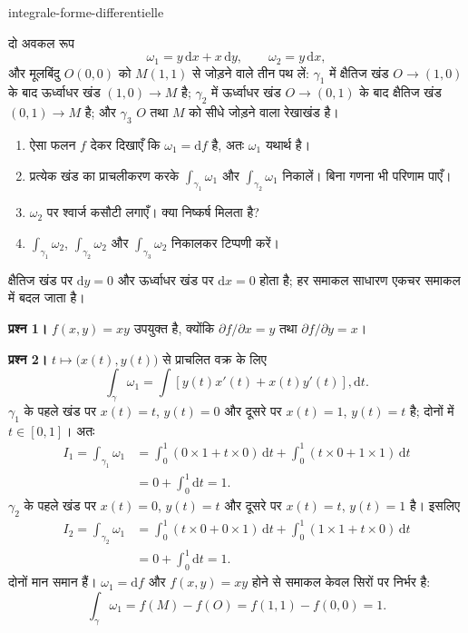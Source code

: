 
\begin{exo}{integrale-forme-differentielle}

दो अवकल रूप
\[
\omega_1 = y\,\mathrm{d}x + x\,\mathrm{d}y,
\qquad
\omega_2 = y\,\mathrm{d}x,
\]
और मूलबिंदु $O(0,0)$ को $M(1,1)$ से जोड़ने वाले तीन पथ लें: $\gamma_1$ में
क्षैतिज खंड $O\to(1,0)$ के बाद ऊर्ध्वाधर खंड $(1,0)\to M$ है; $\gamma_2$ में
ऊर्ध्वाधर खंड $O\to(0,1)$ के बाद क्षैतिज खंड $(0,1)\to M$ है; और $\gamma_3$
$O$ तथा $M$ को सीधे जोड़ने वाला रेखाखंड है।

\begin{enumerate}
\item ऐसा फलन $f$ देकर दिखाएँ कि $\omega_1 = \mathrm{d}f$ है, अतः $\omega_1$ यथार्थ है।
\item प्रत्येक खंड का प्राचलीकरण करके $\int_{\gamma_1}\omega_1$ और $\int_{\gamma_2}\omega_1$ निकालें। बिना गणना भी परिणाम पाएँ।
\item $\omega_2$ पर श्वार्ज कसौटी लगाएँ। क्या निष्कर्ष मिलता है?
\item $\int_{\gamma_1}\omega_2$, $\int_{\gamma_2}\omega_2$ और $\int_{\gamma_3}\omega_2$ निकालकर टिप्पणी करें।
\end{enumerate}

\begin{indication}
क्षैतिज खंड पर $\mathrm{d}y = 0$ और ऊर्ध्वाधर खंड पर $\mathrm{d}x = 0$ होता है;
हर समाकल साधारण एकचर समाकल में बदल जाता है।
\end{indication}

\begin{solution}
\textbf{प्रश्न 1।} $f(x,y) = xy$ उपयुक्त है, क्योंकि $\partial f/\partial x = y$ तथा $\partial f/\partial y = x$।

\textbf{प्रश्न 2।} $t\mapsto\bigl(x(t),y(t)\bigr)$ से प्राचलित वक्र के लिए
\[
\int_\gamma\omega_1
= \int \left[y(t)x'(t)+x(t)y'(t)\right],\mathrm{d}t.
\]
$\gamma_1$ के पहले खंड पर $x(t)=t$, $y(t)=0$ और दूसरे पर $x(t)=1$, $y(t)=t$ है;
दोनों में $t\in[0,1]$। अतः
\[
\begin{aligned}
I_1=\int_{\gamma_1}\omega_1
&= \int_0^1(0\times1+t\times0)\,\mathrm{d}t
+\int_0^1(t\times0+1\times1)\,\mathrm{d}t\\
&=0+\int_0^1\mathrm{d}t=1.
\end{aligned}
\]
$\gamma_2$ के पहले खंड पर $x(t)=0$, $y(t)=t$ और दूसरे पर $x(t)=t$, $y(t)=1$ है। इसलिए
\[
\begin{aligned}
I_2=\int_{\gamma_2}\omega_1
&= \int_0^1(t\times0+0\times1)\,\mathrm{d}t
+\int_0^1(1\times1+t\times0)\,\mathrm{d}t\\
&=0+\int_0^1\mathrm{d}t=1.
\end{aligned}
\]
दोनों मान समान हैं। $\omega_1=\mathrm{d}f$ और $f(x,y)=xy$ होने से समाकल केवल सिरों पर निर्भर है:
\[
\int_\gamma\omega_1=f(M)-f(O)=f(1,1)-f(0,0)=1.
\]


\end{solution}
\end{exo}
